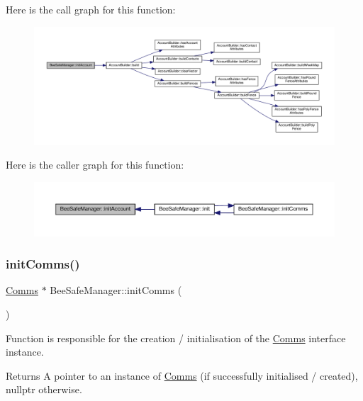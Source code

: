 Here is the call graph for this function\+:
\nopagebreak
\begin{figure}[H]
\begin{center}
\leavevmode
\includegraphics[width=350pt]{d5/d75/class_bee_safe_manager_a7395aeacd246ce69c65f255a2eab1d04_cgraph}
\end{center}
\end{figure}
Here is the caller graph for this function\+:
\nopagebreak
\begin{figure}[H]
\begin{center}
\leavevmode
\includegraphics[width=350pt]{d5/d75/class_bee_safe_manager_a7395aeacd246ce69c65f255a2eab1d04_icgraph}
\end{center}
\end{figure}
\mbox{\label{class_bee_safe_manager_a28306d7ccf7136a6086d666f4ebb6566}} 
\subsubsection{\texorpdfstring{init\+Comms()}{initComms()}}
{\footnotesize\ttfamily \hyperlink{class_comms}{Comms} $\ast$ Bee\+Safe\+Manager\+::init\+Comms (\begin{DoxyParamCaption}{ }\end{DoxyParamCaption})\hspace{0.3cm}{\ttfamily [private]}}

Function is responsible for the creation / initialisation of the \hyperlink{class_comms}{Comms} interface instance.

\begin{DoxyReturn}{Returns}
A pointer to an instance of \hyperlink{class_comms}{Comms} (if successfully initialised / created), nullptr otherwise. 
\end{DoxyReturn}


